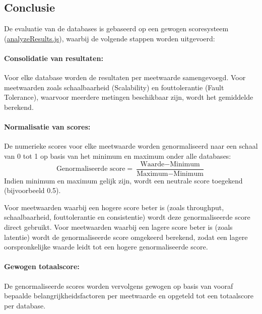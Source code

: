 \subsection{Conclusie}
De evaluatie van de databases is gebaseerd op een gewogen scoresysteem (\href{https://github.com/WoutVC/bachelorproef2024/blob/main/proof_of_concept/analyzeResults.js}{analyzeResults.js}), waarbij de volgende stappen worden uitgevoerd:

\paragraph{Consolidatie van resultaten:} 
Voor elke database worden de resultaten per meetwaarde samengevoegd. Voor meetwaarden zoals schaalbaarheid (Scalability) en fouttolerantie (Fault Tolerance), waarvoor meerdere metingen beschikbaar zijn, wordt het gemiddelde berekend.

\paragraph{Normalisatie van scores:} 
De numerieke scores voor elke meetwaarde worden genormaliseerd naar een schaal van 0 tot 1 op basis van het minimum en maximum onder alle databases:
\[
\text{Genormaliseerde score} = \frac{\text{Waarde} - \text{Minimum}}{\text{Maximum} - \text{Minimum}}
\]
Indien minimum en maximum gelijk zijn, wordt een neutrale score toegekend (bijvoorbeeld 0.5).

Voor meetwaarden waarbij een hogere score beter is (zoals throughput, schaalbaarheid, fouttolerantie en consistentie) wordt deze genormaliseerde score direct gebruikt. Voor meetwaarden waarbij een lagere score beter is (zoals latentie) wordt de genormaliseerde score omgekeerd berekend, zodat een lagere oorspronkelijke waarde leidt tot een hogere genormaliseerde score.

\paragraph{Gewogen totaalscore:} 
De genormaliseerde scores worden vervolgens gewogen op basis van vooraf bepaalde belangrijkheidsfactoren per meetwaarde en opgeteld tot een totaalscore per database.



